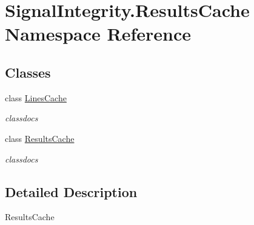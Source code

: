 \hypertarget{namespaceSignalIntegrity_1_1ResultsCache}{}\section{Signal\+Integrity.\+Results\+Cache Namespace Reference}
\label{namespaceSignalIntegrity_1_1ResultsCache}
\subsection*{Classes}
\begin{DoxyCompactItemize}
\item 
class \hyperlink{classSignalIntegrity_1_1ResultsCache_1_1LinesCache}{Lines\+Cache}
\begin{DoxyCompactList}\small\item\em classdocs \end{DoxyCompactList}\item 
class \hyperlink{classSignalIntegrity_1_1ResultsCache_1_1ResultsCache}{Results\+Cache}
\begin{DoxyCompactList}\small\item\em classdocs \end{DoxyCompactList}\end{DoxyCompactItemize}


\subsection{Detailed Description}
\begin{DoxyVerb}ResultsCache\end{DoxyVerb}
 
